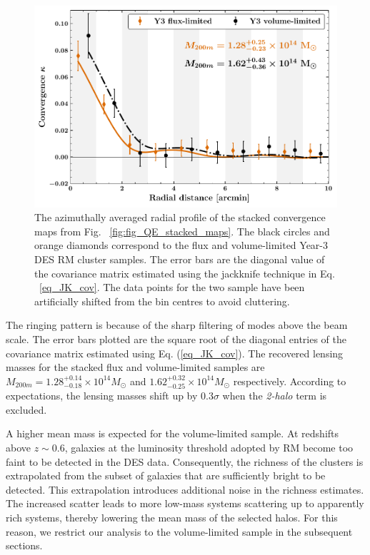 \begin{figure}[ht]
\includegraphics[width=\linewidth]{figs/kappa_model_MF_y3_v6_4_22_full_vl_radprf_JODY.pdf}
\caption{The azimuthally averaged radial profile of the stacked convergence maps from Fig. ~\ref{fig:fig_QE_stacked_maps}. The black circles and orange diamonds correspond to the flux and volume-limited Year-3 DES RM cluster samples. The error bars are the diagonal value of the covariance matrix estimated using the jackknife technique in Eq. ~\ref{eq_JK_cov}. The data points for the two sample have been artificially shifted from the bin centres to avoid cluttering. }
\label{fig:avg_fig_QE_stacked_maps}
\end{figure}

The ringing pattern is because of the sharp filtering of modes above the \sptpol{} beam scale. 
The error bars plotted are the square root of the diagonal entries of the covariance matrix estimated using Eq. (\ref{eq_JK_cov}). 
The recovered lensing masses for the stacked flux and volume-limited samples are $M_{200m} = 1.28^{+0.14}_{-0.18} \times 10^{14} M_{\odot}$ and $1.62^{+0.32}_{-0.25} \times 10^{14} M_{\odot}$ respectively. %
According to expectations, the lensing masses shift up by 0.3$\sigma$ when the {\it 2-halo} term is excluded.


A higher mean mass is expected for the volume-limited sample. 
At redshifts above $z\sim 0.6$, galaxies at the luminosity threshold adopted by RM become too faint to be detected in the DES data. 
Consequently, the richness of the clusters is extrapolated from the subset of galaxies that are sufficiently bright to be detected. 
This extrapolation introduces additional noise in the richness estimates.
The increased scatter leads to more low-mass systems scattering up to apparently rich systems, thereby lowering the mean mass of the selected halos. 
For this reason, we restrict our analysis to the volume-limited sample in the subsequent sections. 

